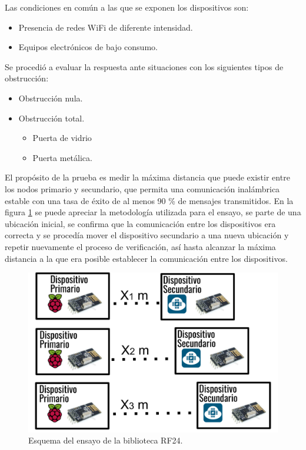 Las condiciones en común a las que se exponen los dispositivos son: 
\begin{itemize}
\item Presencia de redes WiFi de diferente intensidad.
\item Equipos electrónicos de bajo consumo.
\end{itemize}

Se procedió a evaluar la respuesta ante situaciones con los siguientes tipos de obstrucción:  
\begin{itemize}
\item Obstrucción nula.
\item Obstrucción total.
	\begin{itemize}
	\item  Puerta de vidrio
	\item  Puerta metálica.
	\end{itemize} 
\end{itemize}  

El propósito de la prueba es medir la máxima distancia que puede existir entre los nodos primario y secundario, que permita una comunicación inalámbrica estable con una tasa de éxito de al menos 90 \% de mensajes transmitidos. En la figura \ref{fig:figura_c} se puede apreciar la metodología utilizada para el ensayo, se parte de una ubicación inicial, se confirma que la comunicación entre los dispositivos era correcta y se procedía mover el dispositivo secundario a una nueva ubicación y repetir nuevamente el proceso de verificación, así hasta alcanzar la máxima distancia a la que era posible establecer la comunicación entre los dispositivos. 

\begin{figure}[ht]
	\centering
	\includegraphics[scale=.3]{./Figures/Capitulo4/Figura_C.png}
	\caption{Esquema del ensayo de la biblioteca RF24.}
	\label{fig:figura_c}
\end{figure}

